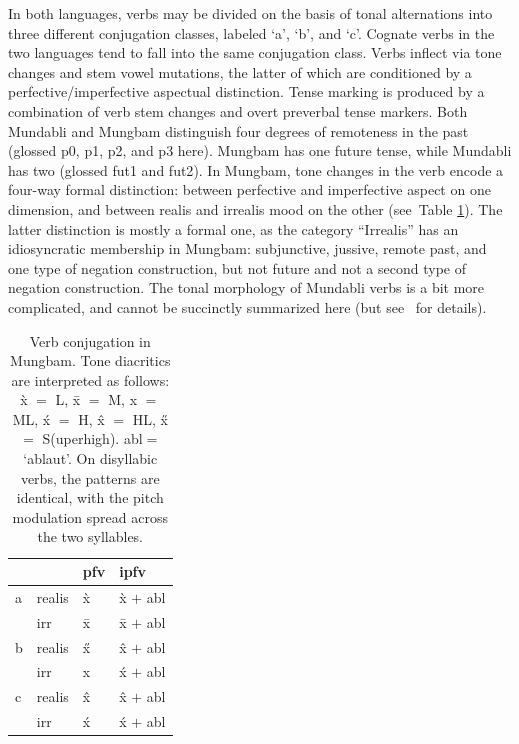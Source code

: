\documentclass[10pt,twoside]{article}
\def\ci#1{{\ipaFont #1}}
\newcommand{\gl}[1]{`#1'}
\newcommand{\tref}[1]{Table \ref{#1}}
\def\ML#1{#1\symbol{"1DC6}} %
\def\Hline{\hline}
\begin{document}
In both languages, verbs may be divided
on the basis of tonal alternations
into three different conjugation classes,
labeled \gl{{\sc a}}, \gl{{\sc b}}, and \gl{{\sc c}}.
Cognate verbs in the two languages tend
to fall into the same conjugation class.
Verbs inflect
via tone changes and stem vowel mutations,
the latter of which are conditioned by
a perfective/imperfective aspectual distinction.
Tense marking is produced by a combination of
verb stem changes and overt preverbal tense markers.
Both Mundabli and Mungbam distinguish
four degrees of remoteness in the past (glossed
{\sc p0}, {\sc p1}, {\sc p2}, and {\sc p3} here). Mungbam has one
future tense, while Mundabli has two (glossed {\sc fut1} and {\sc fut2}).
In Mungbam, tone changes in the verb encode a four-way
formal distinction: between perfective and imperfective
aspect on one dimension, and between 
realis and irrealis mood on the other (see~\tref{tblConjugation}).
The latter distinction is mostly a formal one, as the
category ``Irrealis'' has an idiosyncratic membership
 in Mungbam: subjunctive, jussive,
remote past, and one type of negation construction, but
not future and not a second type of negation construction. 
The tonal morphology of Mundabli verbs is a bit
more complicated, and cannot be succinctly summarized
here (but see~\cite{voll:verbs} for details).
%
\begin{table}[h!]
\centering
\begin{tabular}{l|lll}
\Hline
        &                       &       {\sc pfv}       &       {\sc ipfv}      \\
\hline
{\sc a}     &       {\sc realis}    &       \ci{\`x}             &       \ci{\`x} $+$ {\sc abl}       \\
        &       {\sc irr}       &       \ci{\={x}}           &       \ci{\={x}} $+$ {\sc abl}     \\
\hline
{\sc b}     &       {\sc realis}    &       \ci{\H{x}}           &       \ci{\^x} $+$ {\sc abl}       \\
        &       {\sc irr}       &       \ci{\ML{x}}          &       \ci{\'{x}} $+$ {\sc abl}     \\
\hline
{\sc c}      &       {\sc realis}    &       \ci{\^x}             &       \ci{\^x} $+$ {\sc abl}       \\
        &       {\sc irr}       &       \ci{\'{x}}           &       \ci{\'{x}} $+$ {\sc abl}     \\
\Hline
\end{tabular}
\caption{Verb conjugation in Mungbam. Tone diacritics are interpreted as
follows: \ci{\`x} $=$ L, \ci{\={x}} $=$ M, \ci{\ML{x}} $=$ ML, \ci{\'{x}} $=$ H, \ci{\^{x}} $=$ HL,
\ci{\H{x}} $=$ S(uperhigh). {\sc abl}$=$ `ablaut'.
On disyllabic verbs, the patterns are identical, with the pitch modulation
spread across the two syllables.}
\label{tblConjugation}
\end{table}
%
\end{document}
